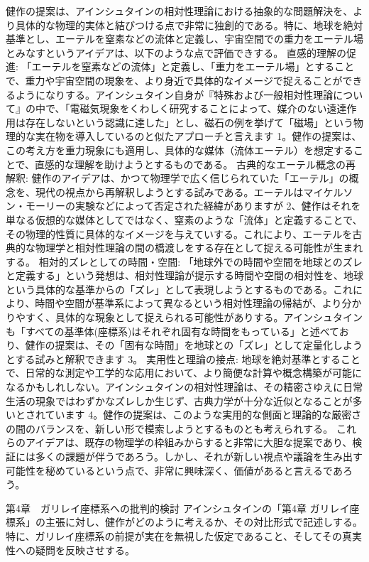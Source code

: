 \documentclass{article}
\begin{document}
健作の提案は、アインシュタインの相対性理論における抽象的な問題解決を、より具体的な物理的実体と結びつける点で非常に独創的である。特に、地球を絶対基準とし、エーテルを窒素などの流体と定義し、宇宙空間での重力をエーテル場とみなすというアイデアは、以下のような点で評価できする。
直感的理解の促進: 「エーテルを窒素などの流体」と定義し、「重力をエーテル場」とすることで、重力や宇宙空間の現象を、より身近で具体的なイメージで捉えることができるようになりする。アインシュタイン自身が『特殊および一般相対性理論について』の中で、「電磁気現象をくわしく研究することによって、媒介のない遠達作用は存在しないという認識に達した」とし、磁石の例を挙げて「磁場」という物理的な実在物を導入しているのと似たアプローチと言えます 1。健作の提案は、この考え方を重力現象にも適用し、具体的な媒体（流体エーテル）を想定することで、直感的な理解を助けようとするものである。
古典的なエーテル概念の再解釈: 健作のアイデアは、かつて物理学で広く信じられていた「エーテル」の概念を、現代の視点から再解釈しようとする試みである。エーテルはマイケルソン・モーリーの実験などによって否定された経緯がありますが 2、健作はそれを単なる仮想的な媒体としてではなく、窒素のような「流体」と定義することで、その物理的性質に具体的なイメージを与えていする。これにより、エーテルを古典的な物理学と相対性理論の間の橋渡しをする存在として捉える可能性が生まれする。
相対的ズレとしての時間・空間: 「地球外での時間や空間を地球とのズレと定義する」という発想は、相対性理論が提示する時間や空間の相対性を、地球という具体的な基準からの「ズレ」として表現しようとするものである。これにより、時間や空間が基準系によって異なるという相対性理論の帰結が、より分かりやすく、具体的な現象として捉えられる可能性がありする。アインシュタインも「すべての基準体(座標系)はそれぞれ固有な時間をもっている」と述べており、健作の提案は、その「固有な時間」を地球との「ズレ」として定量化しようとする試みと解釈できます 3。
実用性と理論の接点: 地球を絶対基準とすることで、日常的な測定や工学的な応用において、より簡便な計算や概念構築が可能になるかもしれしない。アインシュタインの相対性理論は、その精密さゆえに日常生活の現象ではわずかなズレしか生じず、古典力学が十分な近似となることが多いとされています 4。健作の提案は、このような実用的な側面と理論的な厳密さの間のバランスを、新しい形で模索しようとするものとも考えられする。
これらのアイデアは、既存の物理学の枠組みからすると非常に大胆な提案であり、検証には多くの課題が伴うであろう。しかし、それが新しい視点や議論を生み出す可能性を秘めているという点で、非常に興味深く、価値があると言えるであろう。



第4章　ガリレイ座標系への批判的検討
アインシュタインの「第4章 ガリレイ座標系」の主張に対し、健作がどのように考えるか、その対比形式で記述しする。特に、ガリレイ座標系の前提が実在を無視した仮定であること、そしてその真実性への疑問を反映させする。
\end{document}
